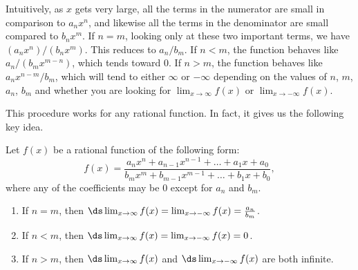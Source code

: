 Intuitively, as $x$ gets very large, all the terms in the numerator are small in comparison to $a_nx^n$, and likewise all the terms in the denominator are small compared to $b_nx^m$.  If $n=m$, looking only at these two important terms, we have $(a_nx^n)/(b_nx^m)$.  This reduces to $a_n/b_m$.  If $n<m$, the function behaves like $a_n/(b_mx^{m-n})$, which tends toward 0.  If $n>m$, the function behaves like $a_nx^{n-m}/b_m$, which will tend to either $\infty$ or $-\infty$ depending on the values of $n$, $m$, $a_n$, $b_m$ and whether you are looking for $\lim_{x\rightarrow\infty} f(x)$ or $\lim_{x\rightarrow-\infty} f(x)$.

This procedure works for any rational function.  In fact, it gives us the following key idea.

{Let $f(x)$ be a rational function of the following form:
\[f(x)=\frac{a_nx^n + a_{n-1}x^{n-1}+\dots + a_1x + a_0}{b_mx^m + b_{m-1}x^{m-1} + \dots + b_1x + b_0},\]
where any of the coefficients may be 0 except for $a_n$ and $b_m$.
\begin{enumerate}
\item If $n=m$, then $\ds\lim_{x\rightarrow\infty} f(x) = \lim_{x\rightarrow-\infty} f(x) = \frac{a_n}{b_m}$.
\item If $n<m$, then $\ds\lim_{x\rightarrow\infty} f(x) = \lim_{x\rightarrow-\infty} f(x) = 0$.
\item If $n>m$, then $\ds\lim_{x\rightarrow\infty} f(x)$ and $\ds\lim_{x\to-\infty} f(x)$ are both infinite.
\end{enumerate}}



